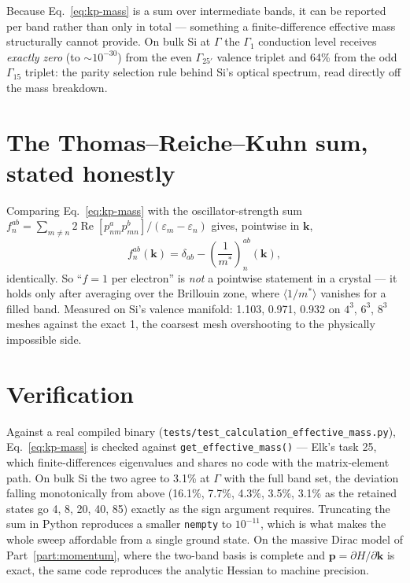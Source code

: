 \documentclass[11pt]{article}
\begin{document}
Because Eq.~\eqref{eq:kp-mass} is a sum over intermediate bands, it can be
reported per band rather than only in total --- something a finite-difference
effective mass structurally cannot provide. On bulk Si at $\Gamma$ the
$\Gamma_1$ conduction level receives \emph{exactly zero} (to $\sim10^{-30}$)
from the even $\Gamma_{25'}$ valence triplet and 64\% from the odd
$\Gamma_{15}$ triplet: the parity selection rule behind Si's optical spectrum,
read directly off the mass breakdown.

\section{The Thomas--Reiche--Kuhn sum, stated honestly}

Comparing Eq.~\eqref{eq:kp-mass} with the oscillator-strength sum
$f^{ab}_n=\sum_{m\neq n}2\operatorname{Re}[p^a_{nm}p^b_{mn}]/
(\varepsilon_m-\varepsilon_n)$ gives, pointwise in $\mathbf k$,
\begin{equation}
  f^{ab}_n(\mathbf k)=\delta_{ab}-\left(\frac{1}{m^*}\right)^{ab}_{n}(\mathbf k),
\end{equation}
identically. So ``$f=1$ per electron'' is \emph{not} a pointwise statement in a
crystal --- it holds only after averaging over the Brillouin zone, where
$\langle 1/m^*\rangle$ vanishes for a filled band. Measured on Si's valence
manifold: 1.103, 0.971, 0.932 on $4^3$, $6^3$, $8^3$ meshes against the exact 1,
the coarsest mesh overshooting to the physically impossible side.

\section{Verification}

Against a real compiled binary (\texttt{tests/test\_calculation\_effective\_mass.py}),
Eq.~\eqref{eq:kp-mass} is checked against \texttt{get\_effective\_mass()} ---
Elk's task 25, which finite-differences eigenvalues and shares no code with the
matrix-element path. On bulk Si the two agree to 3.1\% at $\Gamma$ with the
full band set, the deviation falling monotonically from above
(16.1\%, 7.7\%, 4.3\%, 3.5\%, 3.1\% as the retained states go 4, 8, 20, 40, 85)
exactly as the sign argument requires. Truncating the sum in Python reproduces a
smaller \texttt{nempty} to $10^{-11}$, which is what makes the whole sweep
affordable from a single ground state. On the massive Dirac model of
Part~\ref{part:momentum}, where the two-band basis is complete and
$\mathbf p=\partial H/\partial\mathbf k$ is exact, the same code reproduces the
analytic Hessian to machine precision.
\end{document}
